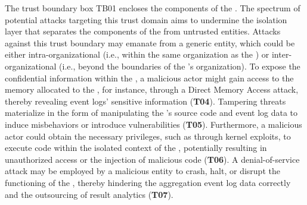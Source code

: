 \begin{newj}
The trust boundary box TB01 encloses the components of the . The spectrum of potential attacks targeting this trust domain aims to undermine the isolation layer that separates the components of the  from untrusted entities. Attacks against this trust boundary may emanate from a generic entity, which could be either intra-organizational (i.e., within the same organization as the ) or inter-organizational (i.e., beyond the boundaries of the 's organization). To expose the confidential information within the , a malicious actor might gain access to the memory allocated to the , for instance, through a Direct Memory Access attack\cite{cita}, thereby revealing event logs' sensitive information (\textbf{T04}). Tampering threats materialize in the form of manipulating the 's source code and event log data to induce misbehaviors or introduce vulnerabilities (\textbf{T05}). Furthermore, a malicious actor could obtain the necessary privileges, such as through kernel exploits, to execute code within the isolated context of the , potentially resulting in unauthorized access or the injection of malicious code (\textbf{T06}). A denial-of-service attack may be employed by a malicious entity to crash, halt, or disrupt the functioning of the , thereby hindering the aggregation event log data correctly and the outsourcing of result analytics (\textbf{T07}). 


\end{newj}

